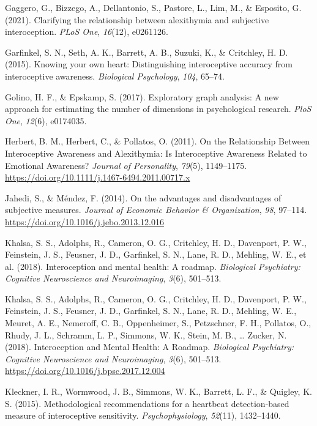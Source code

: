 \documentclass[
  man,
  floatsintext,
  longtable,
  nolmodern,
  notxfonts,
  notimes,
  colorlinks=true,linkcolor=blue,citecolor=blue,urlcolor=blue]{apa7}
\newlength{\cslhangindent}
\newenvironment{CSLReferences}[2] %
 {\begin{list}{}{%
  \setlength{\itemindent}{0pt}
  \setlength{\leftmargin}{0pt}
  \setlength{\parsep}{0pt}
  \ifodd #1
   \setlength{\leftmargin}{\cslhangindent}
   \setlength{\itemindent}{-1\cslhangindent}
  \fi
  \setlength{\itemsep}{#2\baselineskip}}}
 {\end{list}}
\begin{document}
\begin{CSLReferences}{1}{0}
Gaggero, G., Bizzego, A., Dellantonio, S., Pastore, L., Lim, M., \&
Esposito, G. (2021). Clarifying the relationship between alexithymia and
subjective interoception. \emph{PLoS One}, \emph{16}(12), e0261126.

Garfinkel, S. N., Seth, A. K., Barrett, A. B., Suzuki, K., \& Critchley,
H. D. (2015). Knowing your own heart: Distinguishing interoceptive
accuracy from interoceptive awareness. \emph{Biological Psychology},
\emph{104}, 65--74.

Golino, H. F., \& Epskamp, S. (2017). Exploratory graph analysis: A new
approach for estimating the number of dimensions in psychological
research. \emph{PloS One}, \emph{12}(6), e0174035.

Herbert, B. M., Herbert, C., \& Pollatos, O. (2011). On the Relationship
Between Interoceptive Awareness and Alexithymia: Is Interoceptive
Awareness Related to Emotional Awareness? \emph{Journal of Personality},
\emph{79}(5), 1149--1175.
\url{https://doi.org/10.1111/j.1467-6494.2011.00717.x}

Jahedi, S., \& Méndez, F. (2014). On the advantages and disadvantages of
subjective measures. \emph{Journal of Economic Behavior \&
Organization}, \emph{98}, 97--114.
\url{https://doi.org/10.1016/j.jebo.2013.12.016}

Khalsa, S. S., Adolphs, R., Cameron, O. G., Critchley, H. D., Davenport,
P. W., Feinstein, J. S., Feusner, J. D., Garfinkel, S. N., Lane, R. D.,
Mehling, W. E., et al. (2018). Interoception and mental health: A
roadmap. \emph{Biological Psychiatry: Cognitive Neuroscience and
Neuroimaging}, \emph{3}(6), 501--513.

Khalsa, S. S., Adolphs, R., Cameron, O. G., Critchley, H. D., Davenport,
P. W., Feinstein, J. S., Feusner, J. D., Garfinkel, S. N., Lane, R. D.,
Mehling, W. E., Meuret, A. E., Nemeroff, C. B., Oppenheimer, S.,
Petzschner, F. H., Pollatos, O., Rhudy, J. L., Schramm, L. P., Simmons,
W. K., Stein, M. B., \ldots{} Zucker, N. (2018). Interoception and
Mental Health: A Roadmap. \emph{Biological Psychiatry: Cognitive
Neuroscience and Neuroimaging}, \emph{3}(6), 501--513.
\url{https://doi.org/10.1016/j.bpsc.2017.12.004}

Kleckner, I. R., Wormwood, J. B., Simmons, W. K., Barrett, L. F., \&
Quigley, K. S. (2015). Methodological recommendations for a heartbeat
detection-based measure of interoceptive sensitivity.
\emph{Psychophysiology}, \emph{52}(11), 1432--1440.


\end{CSLReferences}
\end{document}
